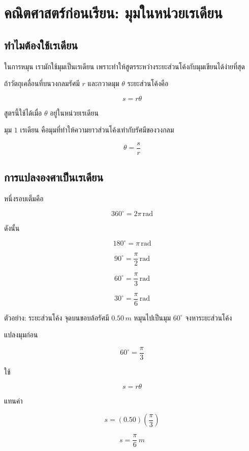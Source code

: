\newpage{}

\section{คณิตศาสตร์ก่อนเรียน: มุมในหน่วยเรเดียน}

\subsection{ทำไมต้องใช้เรเดียน}

ในการหมุน เรามักใช้มุมเป็นเรเดียน เพราะทำให้สูตรระหว่างระยะส่วนโค้งกับมุมเขียนได้ง่ายที่สุด

ถ้าวัตถุเคลื่อนที่บนวงกลมรัศมี $r$ และกวาดมุม $\theta$ ระยะส่วนโค้งคือ

\[
s=r\theta
\]

สูตรนี้ใช้ได้เมื่อ $\theta$ อยู่ในหน่วยเรเดียน

\begin{tcolorbox}[title=นิยามของเรเดียน]
มุม $1$ เรเดียน คือมุมที่ทำให้ความยาวส่วนโค้งเท่ากับรัศมีของวงกลม

\[
\theta=\frac{s}{r}
\]
\end{tcolorbox}

\subsection{การแปลงองศาเป็นเรเดียน}

หนึ่งรอบเต็มคือ

\[
360^\circ=2\pi\,\text{rad}
\]

ดังนั้น

\[
180^\circ=\pi\,\text{rad}
\]

\[
90^\circ=\frac{\pi}{2}\,\text{rad}
\]

\[
60^\circ=\frac{\pi}{3}\,\text{rad}
\]

\[
30^\circ=\frac{\pi}{6}\,\text{rad}
\]

\begin{examplebox}{ตัวอย่าง: ระยะส่วนโค้ง}
จุดบนขอบล้อรัศมี $0.50\,\si{m}$ หมุนไปเป็นมุม $60^\circ$ จงหาระยะส่วนโค้ง

แปลงมุมก่อน

\[
60^\circ=\frac{\pi}{3}
\]

ใช้

\[
s=r\theta
\]

แทนค่า

\[
s=(0.50)\left(\frac{\pi}{3}\right)
\]

\[
s=\frac{\pi}{6}\,\si{m}
\]
\end{examplebox}

